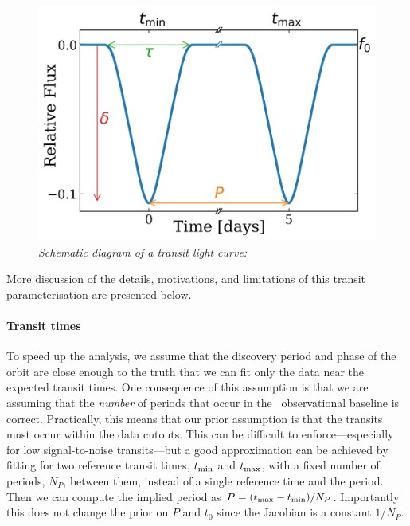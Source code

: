 \documentclass[linenumbers,floatfix,ApJL,twocolumn]{aastex631}
\begin{document}
\begin{figure}
  \includegraphics[width=\linewidth]{figures/transit_model.png}
  \caption{\textit{Schematic diagram of a transit light curve:} }
  \label{fig:schematic-transit-plot}
\end{figure}

More discussion of the details, motivations, and limitations of this transit parameterisation are presented below.

\paragraph{Transit times}
To speed up the analysis, we assume that the discovery period and phase of the orbit are close enough to the truth that we can fit only the data near the expected transit times.
One consequence of this assumption is that we are assuming that the \emph{number} of periods that occur in the \tess\ observational baseline is correct.
Practically, this means that our prior assumption is that the transits must occur within the data cutouts.
This can be difficult to enforce---especially for low signal-to-noise transits---but a good approximation can be achieved by fitting for two reference transit times, $t_{\rm min}$ and $t_{\rm max}$, with a fixed number of periods, $N_P$, between them, instead of a single reference time and the period.
Then we can compute the implied period as $P = (t_{\rm max} - t_{\rm min}) / N_P$.
Importantly this does not change the prior on $P$ and $t_0$ since the Jacobian is a constant $1/N_P$.
\end{document}
